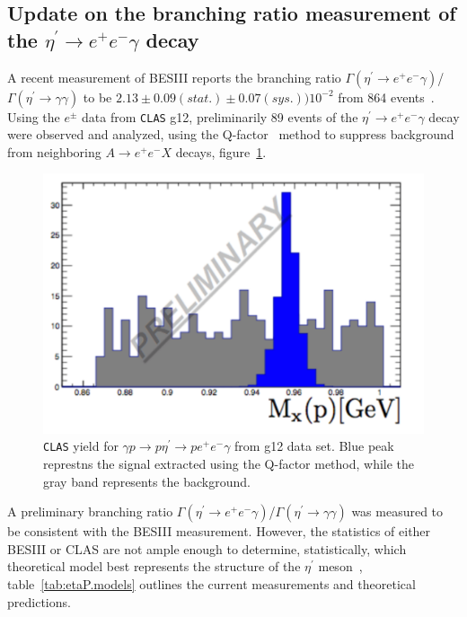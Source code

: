 \documentclass{aip-cp}
\begin{document}
\subsection{Update on the branching ratio measurement  of the $\eta^\prime \rightarrow e^+e^-\gamma$ decay}
A recent measurement of BESIII reports the branching ratio $\Gamma(\eta^{\prime} \to  e^+ e^-  \gamma)$/$\Gamma(\eta^{\prime} \to  \gamma  \gamma)$ to be $2.13\pm0.09(stat.)\pm0.07(sys.))10^{-2}$ from 864 events~\cite{bib7}.  Using the $e^{\pm}$ data from \textsc{\texttt{CLAS}} g12, preliminarily 89 events of the $\eta^{\prime} \to  e^+ e^-  \gamma$ decay were observed and analyzed, using the Q-factor~\cite{bib8} method to suppress background from neighboring $A \to e^+ e^-  X$ decays, figure~\ref{fig:etaP_ff}.
 \begin{figure}[h!]
 	\centerline{\includegraphics[width=160 pt]{figures/clas_etaP_ff_II.pdf}}
 	\caption{\textsc{\texttt{CLAS}} yield for $\gamma p \to p \eta^{\prime}  \to p e^+ e^- \gamma $ from g12 data set. Blue peak represtns the signal extracted using the Q-factor method, while the gray band represents the background.}
 	\label{fig:etaP_ff}
 \end{figure}
  A preliminary branching ratio $\Gamma(\eta^{\prime} \to  e^+ e^-  \gamma)$/$\Gamma(\eta^{\prime} \to  \gamma  \gamma)$ was measured to be consistent with the BESIII measurement. However, the statistics of either BESIII or CLAS are not ample enough to determine, statistically, which theoretical model best represents the structure of the $\eta^{\prime}$ meson~\cite{bib10,bib11,bib12}, table~\ref{tab:etaP.models} outlines the current measurements and theoretical predictions.

%
\end{document}
